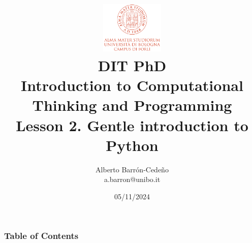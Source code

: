 \documentclass[xcolor=x11names]{beamer}
\title[DIT, PhD]{\vspace{-2pt}\\
\href{http://www.dit.unibo.it}{\includegraphics[width=30mm]{img/UNIBO_logo.png}
} \\
\vspace{6mm} {DIT PhD\\ Introduction to Computational Thinking and Programming} 
\\
{\large Lesson 2. Gentle introduction to Python}
\vspace{-5mm}}
\author[A. Barr\'on-Cede\~no]{{Alberto Barr\'on-Cede\~no \\ a.barron@unibo.it
\vspace{-8mm}}
\institute[DIT-UniBO]{DIT-UniBO}}
\date[2024]{05/11/2024}
\newcommand{\light}[1]{\textcolor{gray}{#1}}
\newcommand{\btVFill}{\vskip0pt plus 1filll}
\newcommand{\red}[1]{\textcolor{red}{#1}}
\DeclareMathOperator*{\argmax}{arg\,max}
\begin{document}
{%
	\begin{frame}[plain]
		\titlepage
	\end{frame}
}

% 
% 
%
% 
% 
% 
% 
% 
% 
% 
% 
% 

\begin{frame}
\frametitle{Table of Contents}
\tableofcontents
\end{frame}
\end{document}
